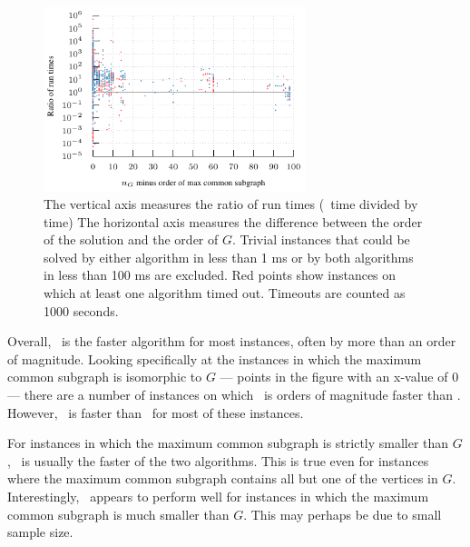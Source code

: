 \begin{figure}[h!]
    \centering
    \includegraphics*[width=0.68\textwidth]{14-mcsplit-i-undirected/plots-based-on-ijcai-paper/more-analysis/plots/sip-runtime-ratio-vs-solution-size}
    \caption{The vertical axis measures the ratio of run times (\kDown\ time divided by \McSplitDown time)
        The horizontal axis measures the difference between the order of the solution and the order of $G$.
        Trivial instances that could be solved by either algorithm in less
        than 1 ms or by both algorithms in less than 100 ms are excluded.  Red points show instances
        on which at least one algorithm timed out. Timeouts are counted as 1000
        seconds.}\label{figure:sip-runtime-ratios}
\end{figure}

Overall, \McSplitDown\ is the faster algorithm for most instances, often by more than
an order of magnitude.  Looking specifically at the instances in which the maximum common
subgraph is isomorphic to $G$ --- points in the figure with an x-value of 0 ---
there are a number of instances on which \kDown\ is orders of magnitude faster than \McSplitDown.  However,
\McSplitDown\ is faster than \kDown\ for most of these instances.

For instances in which the maximum common subgraph is strictly smaller than $G$,
\McSplitDown\ is usually the faster of the two algorithms.  This is true even for instances
where the maximum common subgraph contains all but one of the vertices in $G$.
Interestingly, \kDown\ appears to perform well for instances in which the maximum
common subgraph is much smaller than $G$.  This may perhaps be due to small
sample size.


